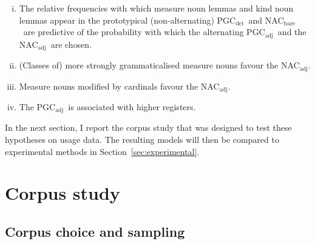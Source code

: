 \documentclass[USenglish]{article}
\newcommand{\Sub}[1]{\ensuremath{\mathrm{_{#1}}}}
\newcommand{\NACb}{NAC\Sub{bare}}
\newcommand{\NACa}{NAC\Sub{adj}}
\newcommand{\PGCd}{PGC\Sub{det}}
\newcommand{\PGCa}{PGC\Sub{adj}}
\begin{document}
\begin{enumerate}[i.]
  \item The relative frequencies with which measure noun lemmas and kind noun lemmas appear in the prototypical (non-alternating) \PGCd\ and \NACb\ are predictive of the probability with which the alternating \PGCa\ and the \NACa\ are chosen.
  \item (Classes of) more strongly grammaticalised measure nouns favour the \NACa.
  \item Measure nouns modified by cardinals favour the \NACa.
  \item The \PGCa\ is associated with higher registers.
\end{enumerate}

\vspace{-1\baselineskip}

In the next section, I report the corpus study that was designed to test these hypotheses on usage data.
The resulting models will then be compared to experimental methods in Section~\ref{sec:experimental}.





\section{Corpus study}
\label{sec:corpusstudies}


\subsection{Corpus choice and sampling}
\label{sec:gettingdata}

\end{document}
